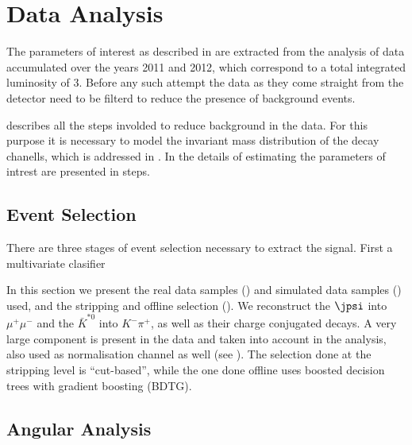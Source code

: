 
\chapter{Data Analysis}
\label{Data_Analysis}

The parameters of interest as described in  are extracted from the analysis of \runone
\lhcb data accumulated over the years 2011 and 2012, which correspond to a total integrated luminosity
of 3\invfb. Before any such attempt the data as they come straight from the detector need to be filterd
to reduce the presence of background events.

 describes all the steps involded to reduce background in the data. For this purpose
it is necessary to model the invariant mass distribution of the \BJpsiKpi decay chanells, which is addressed
in . In  the details of estimating the parameters
of intrest are presented in steps.


\section{Event Selection}
\label{Event_Selection}

There are three stages of event selection necessary to extract the signal. First a multivariate clasifier

In this section we present the real data samples () and simulated data samples ()
used, and the stripping and offline selection (). We reconstruct the $\jpsi$ into $\mu^+\mu^-$ and the $\bar{K}^{*0}$ into $K^-\pi^+$, as well as their charge conjugated decays. A very large \BdJKst component is 
present in the data and taken into account in the analysis, also used as normalisation channel as well 
(see ). The selection done at the stripping level is ``cut-based'', while the one done 
offline uses boosted decision trees with gradient boosting (BDTG). 



\section{Angular Analysis}
\label{Angular_Analysis}


